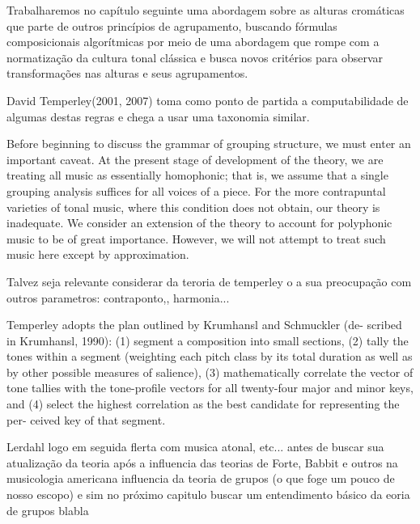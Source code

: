\documentclass[
	12pt,				%
	openright,			%
	twoside,			%
	a4paper,			%
	english,			%
	french,				%
	spanish,			%
	brazil				%
	]{abntex2}
\begin{document}
Trabalharemos no capítulo seguinte uma abordagem sobre as alturas cromáticas que parte de outros princípios de agrupamento, buscando fórmulas composicionais algorítmicas por meio de uma abordagem que rompe com a normatização  da cultura tonal clássica e busca novos critérios para observar transformações nas alturas e seus agrupamentos.







David Temperley(2001, 2007) toma como ponto de partida a computabilidade de algumas destas regras e chega a usar uma taxonomia similar.  



Before beginning to discuss the grammar of grouping structure, we must enter an important caveat. At the present stage of development of the theory, we are treating all music as essentially homophonic; that is, we assume that a single grouping analysis suffices for all voices of a piece. For the more contrapuntal varieties of tonal music, where this condition does not obtain, our theory is inadequate. We consider an extension of the theory to account for polyphonic music to be of great importance. However, we will not attempt to treat such music here except by approximation.\cite{lerdahl1983generative}


Talvez seja relevante considerar da teroria de temperley o a sua preocupação com outros parametros: contraponto,, harmonia...

Temperley adopts the plan outlined by Krumhansl and Schmuckler (de- 
scribed in Krumhansl, 1990): (1) segment a composition into small sections, (2) tally 
the tones within a segment (weighting each pitch class by its total duration as well 
as by other possible measures of salience), (3) mathematically correlate the vector 
of tone tallies with the tone-profile vectors for all twenty-four major and minor keys, 
and (4) select the highest correlation as the best candidate for representing the per- 
ceived key of that segment. 



Lerdahl logo em seguida flerta com musica atonal, etc... \cite{lerdahl1992cognitive} antes de buscar sua atualização da teoria após a influencia das teorias de Forte, Babbit e outros na musicologia americana influencia da teoria de grupos (o que foge um pouco de nosso escopo)  e sim no próximo capitulo buscar um entendimento básico da eoria de grupos blabla
\end{document}
